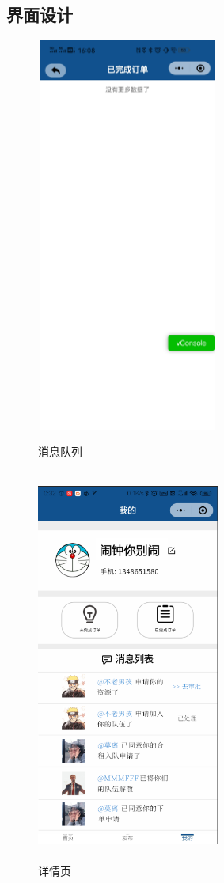 \subsection{界面设计}
\begin{figure}[htbp]
    \centering
    \begin{minipage}[t]{0.48\textwidth}
    \centering
    \includegraphics[width=6cm,height=13cm]{design/image/ui8.png} 
    \caption{消息队列}
    \end{minipage}
    \begin{minipage}[t]{0.48\textwidth}
    \centering
    \includegraphics[width=6cm,height=13cm]{design/image/xiaoxi.png}
    \caption{详情页}
    \end{minipage}
    \end{figure}

